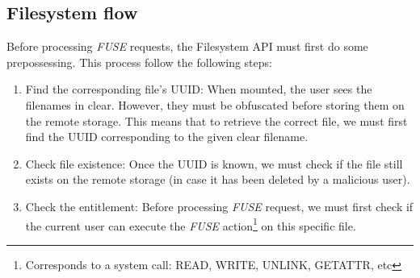 \documentclass[../main.tex]{subfiles}
\begin{document}
\subsection{Filesystem flow}
\label{section:lauxus:filesystem_flow}

\par Before processing \textit{FUSE} requests, the Filesystem API must first do some prepossessing. This process follow the following steps:
\begin{enumerate}
    \item Find the corresponding file's UUID: When mounted, the user sees the filenames in clear. However, they must be obfuscated before storing them on the remote storage. This means that to retrieve the correct file, we must first find the UUID corresponding to the given clear filename.
    \item Check file existence: Once the UUID is known, we must check if the file still exists on the remote storage (in case it has been deleted by a malicious user).
    \item Check the entitlement: Before processing \textit{FUSE} request, we must first check if the current user can execute the \textit{FUSE} action\footnote{Corresponds to a system call: READ, WRITE, UNLINK, GETATTR, etc} on this specific file.
\end{enumerate}
\end{document}
